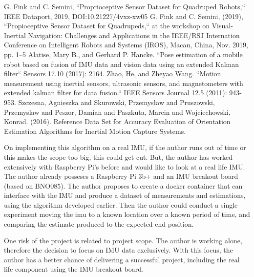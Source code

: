 \documentclass[conference]{IEEEtran}
\begin{document}
\begin{thebibliography}{00}
 G. Fink and C. Semini, ``Proprioceptive Sensor Dataset for Quadruped Robots,`` IEEE Dataport, 2019, DOI:10.21227/4vxz-xw05
 G. Fink and C. Semini, (2019), ``Propioceptive Sensor Dataset for Quadrupeds,`` at the workshop on Visual-Inertial Navigation: Challenges and Applications in the IEEE/RSJ Internation Conference on Intelligent Robots and Systems (IROS), Macau, China, Nov. 2019, pp. 1–5
 Alatise, Mary B., and Gerhard P. Hancke. ``Pose estimation of a mobile robot based on fusion of IMU data and vision data using an extended Kalman filter`` Sensors 17.10 (2017): 2164.
 Zhao, He, and Zheyao Wang. ``Motion measurement using inertial sensors, ultrasonic sensors, and magnetometers with extended kalman filter for data fusion.`` IEEE Sensors Journal 12.5 (2011): 943-953.
 Szczesna, Agnieszka and Skurowski, Przemysław and Pruszowski, Przemyslaw and Peszor, Damian and Paszkuta, Marcin and Wojciechowski, Konrad. (2016). Reference Data Set for Accuracy Evaluation of Orientation Estimation Algorithms for Inertial Motion Capture Systems.
\end{thebibliography}

On implementing this algorithm on a real IMU, if the author runs out of time or this makes the scope too big, this could get cut. But, the author has worked extensively with Raspberry Pi's before and would like to look at a real life IMU. The author already posseses a Raspberry Pi 3b+ and an IMU breakout board (based on BNO085). The author proposes to create a docker container that can interface with the IMU and produce a dataset of measurements and estimations, using the algorithm developed earlier. Then the author could conduct a single experiment moving the imu to a known location over a known period of time, and comparing the estimate produced to the expected end position.

One risk of the project is related to project scope. The author is working alone, therefore the decision to focus on IMU data exclusively. With this focus, the author has a better chance of delivering a successful project, including the real life component using the IMU breakout board.
\end{document}
